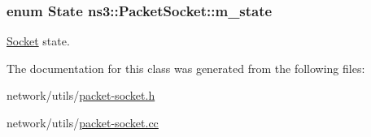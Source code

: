 \subsubsection[{\texorpdfstring{m\+\_\+state}{m_state}}]{\setlength{\rightskip}{0pt plus 5cm}enum {\bf State} ns3\+::\+Packet\+Socket\+::m\+\_\+state\hspace{0.3cm}{\ttfamily [private]}}\hypertarget{classns3_1_1PacketSocket_adbf0f1f9b0a0bed7169ecdcb5a1ef66a}{}\label{classns3_1_1PacketSocket_adbf0f1f9b0a0bed7169ecdcb5a1ef66a}


\hyperlink{classns3_1_1Socket}{Socket} state. 



The documentation for this class was generated from the following files\+:\begin{DoxyCompactItemize}
\item 
network/utils/\hyperlink{packet-socket_8h}{packet-\/socket.\+h}\item 
network/utils/\hyperlink{packet-socket_8cc}{packet-\/socket.\+cc}\end{DoxyCompactItemize}
